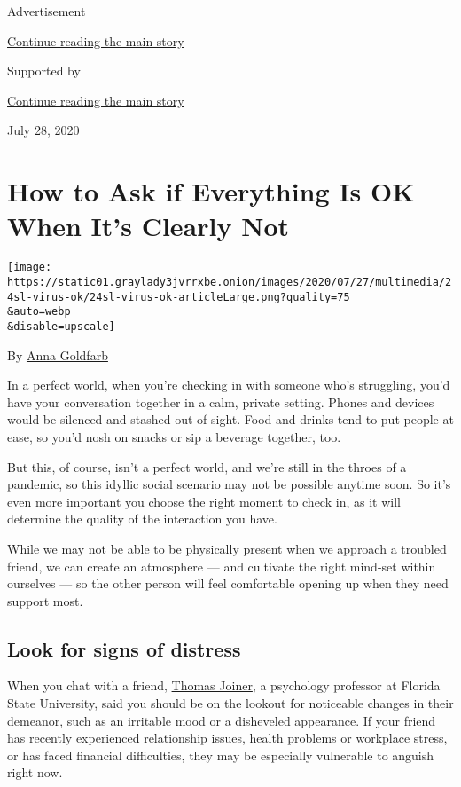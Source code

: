 Advertisement

\protect\hyperlink{after-top}{Continue reading the main story}

Supported by

\protect\hyperlink{after-sponsor}{Continue reading the main story}

July 28, 2020

\hypertarget{how-to-ask-if-everything-is-ok-when-its-clearly-not}{%
\section{How to Ask if Everything Is OK When It's Clearly
Not}\label{how-to-ask-if-everything-is-ok-when-its-clearly-not}}

\texttt{[image: https://static01.graylady3jvrrxbe.onion/images/2020/07/27/multimedia/24sl-virus-ok/24sl-virus-ok-articleLarge.png?quality=75\\\&auto=webp\\\&disable=upscale]}

By \href{https://www.nytimes3xbfgragh.onion/by/anna-goldfarb}{Anna
Goldfarb}

In a perfect world, when you're checking in with someone who's
struggling, you'd have your conversation together in a calm, private
setting. Phones and devices would be silenced and stashed out of sight.
Food and drinks tend to put people at ease, so you'd nosh on snacks or
sip a beverage together, too.

But this, of course, isn't a perfect world, and we're still in the
throes of a pandemic, so this idyllic social scenario may not be
possible anytime soon. So it's even more important you choose the right
moment to check in, as it will determine the quality of the interaction
you have.

While we may not be able to be physically present when we approach a
troubled friend, we can create an atmosphere --- and cultivate the right
mind-set within ourselves --- so the other person will feel comfortable
opening up when they need support most.

\hypertarget{look-for-signs-of-distress}{%
\subsection{Look for signs of
distress}\label{look-for-signs-of-distress}}

When you chat with a friend,
\href{https://psy.fsu.edu/faculty/joinert/joiner.dp.php}{Thomas Joiner},
a psychology professor at Florida State University, said you should be
on the lookout for noticeable changes in their demeanor, such as an
irritable mood or a disheveled appearance. If your friend has recently
experienced relationship issues, health problems or workplace stress, or
has faced financial difficulties, they may be especially vulnerable to
anguish right now.

